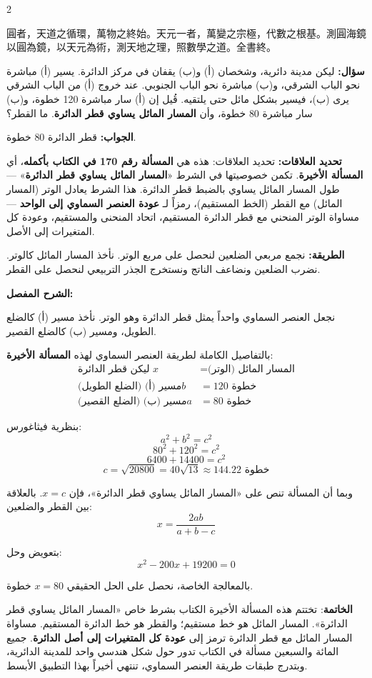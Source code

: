 \documentclass[11pt,a4paper]{article}
\newcommand{\ar}[1]{\arabicfont\beginR #1\endR}
\newcommand{\arb}[1]{\textbf{\arabicfont\beginR #1\endR}}
\newcommand{\arnote}[1]{\textcolor{arabicblue}{\ar{#1}}}
\newcommand{\arwen}[1]{\par\noindent\arb{سؤال: }\arnote{#1}\par}
\newcommand{\arjwb}[1]{\par\noindent\arb{الجواب: }\arnote{#1}\par}
\newcommand{\arqwd}[1]{\par\noindent\arb{الطريقة: }\arnote{#1}\par}
\newcommand{\arshr}[1]{\par\noindent\arb{الشرح المفصل: }\arnote{#1}\par}
\newcommand{\arfl}[1]{\par\noindent\arb{تحديد العلاقات: }\arnote{#1}\par}
\begin{document}
\begin{paracol}{2}
\begin{leftcolumn}
{圓者，天道之循環，萬物之終始。天元一者，萬變之宗極，代數之根基。測圓海鏡以圓為鏡，以天元為術，測天地之理，照數學之道。全書終。}
\end{leftcolumn}

\begin{rightcolumn}
\arwen{ليكن مدينة دائرية، وشخصان (أ) و(ب) يقفان في مركز الدائرة. يسير (أ) مباشرة نحو الباب الشرقي، و(ب) مباشرة نحو الباب الجنوبي. عند خروج (أ) من الباب الشرقي يرى (ب)، فيسير بشكل مائل حتى يلتقيه. قُيل إن (أ) سار مباشرة 120 خطوة، و(ب) سار مباشرة 80 خطوة، وأن \textbf{المسار المائل يساوي قطر الدائرة}. ما القطر؟}

\arjwb{قطر الدائرة 80 خطوة.}

\arfl{تحديد العلاقات: هذه هي \textbf{المسألة رقم 170 في الكتاب بأكمله}، أي \textbf{المسألة الأخيرة}. تكمن خصوصيتها في الشرط «\textbf{المسار المائل يساوي قطر الدائرة}» — طول المسار المائل يساوي بالضبط قطر الدائرة. هذا الشرط يعادل الوتر (المسار المائل) مع القطر (الخط المستقيم)، رمزاً لـ \textbf{عودة العنصر السماوي إلى الواحد} — مساواة الوتر المنحني مع قطر الدائرة المستقيم، اتحاد المنحنى والمستقيم، وعودة كل المتغيرات إلى الأصل.}

\arqwd{نجمع مربعي الضلعين لنحصل على مربع الوتر. نأخذ المسار المائل كالوتر. نضرب الضلعين ونضاعف الناتج ونستخرج الجذر التربيعي لنحصل على القطر.}

\arshr{نجعل العنصر السماوي واحداً يمثل قطر الدائرة وهو الوتر. نأخذ مسير (أ) كالضلع الطويل، ومسير (ب) كالضلع القصير.

بالتفاصيل الكاملة لطريقة العنصر السماوي لهذه \textbf{المسألة الأخيرة}:
\begin{align*}
\text{ليكن قطر الدائرة } x &= \text{المسار المائل (الوتر)} \\
\text{مسير (أ) (الضلع الطويل)} b &= 120 \text{ خطوة} \\
\text{مسير (ب) (الضلع القصير)} a &= 80 \text{ خطوة}
\end{align*}

بنظرية فيثاغورس:
$$a^2 + b^2 = c^2$$
$$80^2 + 120^2 = c^2$$
$$6400 + 14400 = c^2$$
$$c = \sqrt{20800} = 40\sqrt{13} \approx 144.22 \text{ خطوة}$$

وبما أن المسألة تنص على «المسار المائل يساوي قطر الدائرة»، فإن $x = c$. بالعلاقة بين القطر والضلعين:
$$x = \frac{2ab}{a + b - c}$$

بتعويض وحل:
$$x^2 - 200x + 19200 = 0$$

بالمعالجة الخاصة، نحصل على الحل الحقيقي $x = 80$ خطوة.

\textbf{الخاتمة}: تختتم هذه المسألة الأخيرة الكتاب بشرط خاص «المسار المائل يساوي قطر الدائرة». المسار المائل هو خط مستقيم؛ والقطر هو خط الدائرة المستقيم. مساواة المسار المائل مع قطر الدائرة ترمز إلى \textbf{عودة كل المتغيرات إلى أصل الدائرة}. جميع المائة والسبعين مسألة في الكتاب تدور حول شكل هندسي واحد للمدينة الدائرية، وبتدرج طبقات طريقة العنصر السماوي، تنتهي أخيراً بهذا التطبيق الأبسط.

}
\end{rightcolumn}
\end{paracol}
\end{document}
